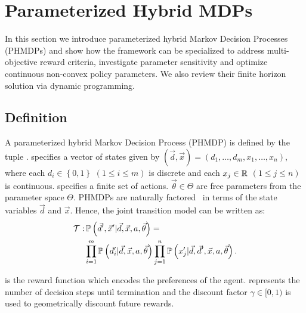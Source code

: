 \section{Parameterized Hybrid MDPs}
\label{sec:hybrid_mdps}

In this section we introduce parameterized hybrid Markov Decision
Processes (PHMDPs) and show how the framework can be specialized to
address multi-objective reward criteria, investigate parameter
sensitivity and optimize continuous non-convex policy parameters. We
also review their finite horizon solution via dynamic programming.

\subsection{Definition}
\label{sec:hybrid_mdps_def}

A parameterized hybrid Markov Decision Process (PHMDP) is defined by the tuple {\footnotesize \PMDPTuple}. {\footnotesize \State} specifies
a vector of states given by {\footnotesize $(\vec{d}, \vec{x}) =  \left( d_1, \ldots, d_m, x_1, \ldots, x_n \right) $}, where each {\footnotesize $ d_i \in \left\lbrace 0, 1 \right\rbrace $} {\footnotesize $\left( 1 \leq i \leq m \right)$} is discrete and each
{\footnotesize$ x_j \in \mathbb{R} $} {\footnotesize $\left( 1 \leq j \leq   n \right)$} is continuous. {\footnotesize \Action} specifies a
finite set of actions.  {\footnotesize $\vec{\theta} \in \Theta$} are free parameters from the parameter space {\footnotesize $ \Theta $}. PHMDPs are naturally factored~\parencite{Boutilier_JAIR_1999} in terms of the state variables {\footnotesize$\vec{d}$} and {\footnotesize
$\vec{x}$}. Hence, the joint transition model can be written as:
{\footnotesize
\abovedisplayskip=0pt
\belowdisplayskip=0pt
\begin{align}
    \label{eq:hmdp_tfunc}
    \mathcal{T} :& \, \mathbb{P}\left({\vec{d}', \vec{x}' | \vec{d}, \vec{x}, a, \vec{\theta}}\right) = \nonumber \\
    & \prod_{i=1}^{m} \mathbb{P}\left({d_i' | \vec{d}, \vec{x}, a, \vec{\theta}}\right) \prod_{j=1}^{n} \mathbb{P}\left({x_j' | \vec{d}, \vec{d}', \vec{x}, a, \vec{\theta}}\right).
\end{align}   
}

{\footnotesize \RewardFunc} is the reward function which encodes the preferences of the agent. {\footnotesize \Horizon} represents the
number of decision steps until termination and the discount factor {\footnotesize $\gamma \in [0, 1)$} is used to geometrically discount
future rewards.

